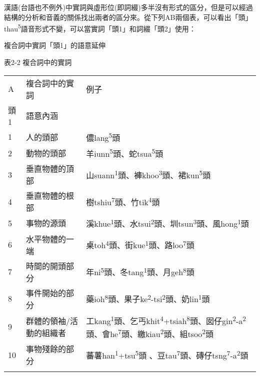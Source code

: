 \textrm{漢語(台語也不例外)中實詞與虛形位(即詞綴)多半沒有形式的區分，但是可以經過結構的分析和音義的關係找出兩者的區分來。從下列AB兩個表，可以看出「頭」thau}\textrm{\textsuperscript{5}}\textrm{語音形式不變，可以當實詞「頭1」和詞綴「頭2」使用：}

\textrm{複合詞中實詞「頭1」的語意延伸}

表2-2 複合詞中的實詞

\tablefirsthead{}

\tabletail{}
\tablelasttail{}
\begin{tabularx}{\textwidth}{XXX}
\lsptoprule

A & 複合詞中的實詞 & 例子\\
\hhline{--~}
頭1 & \multicolumn{1}{X}{ 語意內涵} & \\
1 & 人的頭部 & {\sffamily \textrm{儂lang}\textrm{\textsuperscript{5}}\textrm{頭}}\\
2 & 動物的頭部 & {\sffamily \textrm{羊iunn}\textrm{\textsuperscript{5}}\textrm{頭、蛇tsua}\textrm{\textsuperscript{5}}\textrm{頭}}\\
3 & 垂直物體的頂部 & {\sffamily \textrm{山suann}\textrm{\textsuperscript{1}}\textrm{頭、褲khoo}\textrm{\textsuperscript{3}}\textrm{頭、裙kun}\textrm{\textsuperscript{5}}\textrm{頭}}\\
4 & 垂直物體的根部 & {\sffamily \textrm{樹tshiu}\textrm{\textsuperscript{7}}\textrm{頭、竹tik}\textrm{\textsuperscript{4}}\textrm{頭}}\\
5 & 事物的源頭 & {\sffamily \textrm{溪khue}\textrm{\textsuperscript{1}}\textrm{頭、水tsui}\textrm{\textsuperscript{2}}\textrm{頭、圳tsun}\textrm{\textsuperscript{3}}\textrm{頭、風hong}\textrm{\textsuperscript{1}}\textrm{頭}}\\
6 & 水平物體的一端 & {\sffamily \textrm{桌toh}\textrm{\textsuperscript{4}}\textrm{頭、街kue}\textrm{\textsuperscript{1}}\textrm{頭、路loo}\textrm{\textsuperscript{7}}\textrm{頭}}\\
7 & 時間的開頭部分 & {\sffamily \textrm{年ni}\textrm{\textsuperscript{5}}\textrm{頭、冬tang}\textrm{\textsuperscript{1}}\textrm{頭、月geh}\textrm{\textsuperscript{8}}\textrm{頭}}\\
8 & 事件開始的部分 & {\sffamily \textrm{藥ioh}\textrm{\textsuperscript{8}}\textrm{頭、果子ke}\textrm{\textsuperscript{2}}\textrm{{}-tsi}\textrm{\textsuperscript{2}}\textrm{頭、奶lin}\textrm{\textsuperscript{1}}\textrm{頭}}\\
9 & 群體的領袖/活動的組織者 & {\sffamily \textrm{工kang}\textrm{\textsuperscript{1}}\textrm{頭、乞丐khit}\textrm{\textsuperscript{4}}\textrm{+tsiah}\textrm{\textsuperscript{8}}\textrm{頭、囡仔gin}\textrm{\textsuperscript{2}}\textrm{{}-a}\textrm{\textsuperscript{2}}\textrm{頭、會he}\textrm{\textsuperscript{7}}\textrm{頭、繳kiau}\textrm{\textsuperscript{2}}\textrm{頭、組tsoo}\textrm{\textsuperscript{2}}\textrm{頭}}\\
10 & 事物殘餘的部分 & {\sffamily \textrm{蕃薯han}\textrm{\textsuperscript{1}}\textrm{+tsu}\textrm{\textsuperscript{5}}\textrm{頭 、豆tau}\textrm{\textsuperscript{7}}\textrm{頭、磚仔tsng}\textrm{\textsuperscript{7}}\textrm{{}-a}\textrm{\textsuperscript{2}}\textrm{頭}}\\
\lspbottomrule
\end{tabularx}
